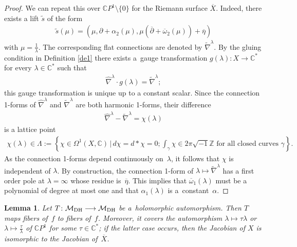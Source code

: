 \documentclass[pdftex]{sigma}
\numberwithin{equation}{section}
\newtheorem{Lemma}[Theorem]{Lemma}
\begin{document}
\begin{proof}
We can repeat this over $\mathbb CP^1\setminus\{0\}$ for the Riemann surface $\overline X$. Indeed, there exists a lift $\widetilde s$ of the form
\begin{gather*}\widetilde{s}(\mu) = (\mu,\partial +\alpha_2(\mu), \mu(\overline{\partial}+ \overline{\omega}_2(\mu))+\overline{\eta})\end{gather*}
with $\mu = \frac{1}{\lambda}$. The corresponding f\/lat connections are denoted by $\widetilde{\nabla}^\lambda$. By the gluing condition in Def\/inition \ref{de1} there exists a~gauge transformation $g(\lambda) \colon X \longrightarrow \mathbb C^*$ for every $\lambda \in \mathbb C^*$ such that \begin{gather*}\widehat{\nabla}^\lambda\cdot g(\lambda) = \widetilde{\nabla}^\lambda ;\end{gather*}
this gauge transformation is unique up to a constant scalar. Since the connection 1-forms of $\widehat{\nabla}^\lambda$ and $\widetilde{\nabla}^\lambda$ are both harmonic 1-forms, their dif\/ference
\begin{gather*}\widehat{\nabla}^\lambda-\widetilde{\nabla}^\lambda = \chi(\lambda)\end{gather*}
is a lattice point
\begin{gather}\label{Gamma}
\chi(\lambda) \in \Lambda := \left\{\!\chi \in \Omega^1(X, \mathbb C) \,|\, d\chi = d*\chi = 0;
\int_\gamma\chi\in2\pi\sqrt{-1}\mathbb Z \text{ for all closed curves } \gamma\!\right\}\!.\!\!\!\!\end{gather}
As the connection 1-forms depend continuously on~$\lambda$, it follows that $\chi$ is independent of $\lambda$. By construction, the connection 1-form of $\lambda \longmapsto \widetilde{\nabla}^\lambda$ has a f\/irst order pole at $\lambda = \infty$ whose residue is~$\overline{\eta}$.
This implies that $\overline{\omega}_1(\lambda)$ must be a polynomial of degree at most one and that $\alpha_1(\lambda)$ is a~constant~$\alpha$.
\end{proof}

\begin{Lemma}\label{tau-lemma} Let $T \colon {\mathcal M}_{\rm DH} \longrightarrow {\mathcal M}_{\rm DH}$ be a~holomorphic automorphism. Then $T$ maps fibers of~$f$ to fibers of~$f$. Moreover, it covers the automorphism $\lambda \longmapsto \tau\lambda$ or $\lambda \longmapsto \frac{\tau}{\lambda}$ of ${\mathbb C}P^1$ for some $\tau \in \mathbb C^*$; if the latter case occurs, then the Jacobian of $X$ is isomorphic to the Jacobian of~$\overline X$.
\end{Lemma}
\end{document}
